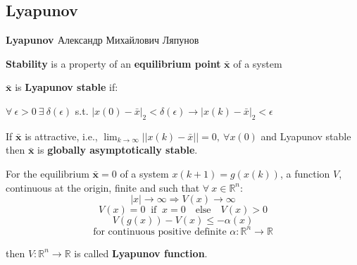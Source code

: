 
\subsection{Lyapunov} %

\begin{sstTitleBox}[Plum]{\center\textbf{{\large
					Lyapunov
				}	}
		Александр Михайлович Ляпунов
	}

	\begin{sstOnlyFrame}[Plum]
		\textbf{Stability} is a property of an
		\textbf{equilibrium point} $\bar{\mathbf{x}}$
		of a system
	\end{sstOnlyFrame}

	\begin{sstOnlyFrame}[Plum]
		\begin{definition}
			$\bar{\mathbf{x}}$ is \textbf{Lyapunov stable} if:

			$\forall\ \epsilon>0\ \exists\ \delta(\epsilon)$ s.t.
			$| x(0) - \bar{x} |_{\scriptscriptstyle 2}< \delta(\epsilon) \to
				| x(k) - \bar{x}|_{\scriptscriptstyle 2} < \epsilon$
		\end{definition}
	\end{sstOnlyFrame}

	\begin{sstOnlyFrame}[Plum]
		\begin{definition}
			If $\bar{\mathbf{x}}$ is attractive, i.e.,
			$\lim_{k\to\infty} ||x(k)-\bar{x}||=0,\ \forall x(0)$
			and Lyapunov stable
			then $\bar{\mathbf{x}}$ is \textbf{globally asymptotically stable}.
		\end{definition}
	\end{sstOnlyFrame}

	\begin{sstOnlyFrame}[Plum]
		\begin{definition}
			For the equilibrium $\bar{\mathbf{x}}=0$
			of a system $x(k+1)=g(x(k))$,
			a function $V$, continuous at the origin,
			finite and such that
			$\forall\ x\in \mathbb{R}^{n}$:
			\[
				|x|   \to\infty              \Rightarrow V(x)  \to\infty\]
			\[
				V(x)=0 \ \text{ if }\ x=0 \quad\text{else}\quad V(x)>0             \]
			\[
				V(g(x)) - V(x) \leq -\alpha(x)                          \]
			\[
				\text{for continuous positive definite }
				\alpha:\mathbb{R}^n\to \mathbb{R}
			\]

			then  $V:\mathbb{R}^n\to \mathbb{R}$
			is called \textbf{Lyapunov function}.
		\end{definition}
	\end{sstOnlyFrame}


\end{sstTitleBox}
